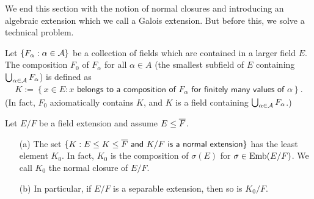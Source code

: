 We end this section with the notion of normal closures and introducing an algebraic extension which we call a Galois extension.
But before this, we solve a technical problem.
\begin{obs}\label{composition of infinitely many fields}
    Let $\{F_\alpha: \alpha\in{\mathcal{A}}\}$ be a collection of fields which are contained in a larger field $E$.
    The composition $F_0$ of $F_\alpha$ for all $\alpha\in A$ (the smallest subfield of $E$ containing $\bigcup_{\alpha\in{\mathcal{A}}} F_\alpha$) is defined as
    \begin{align*}
        K:=\left\{x\in E: \textsf{$x$ belongs to a composition of $F_\alpha$ for finitely many values of $\alpha$}\right\}.
    \end{align*}
    (In fact, $F_0$ axiomatically contains $K$, and $K$ is a field containing $\bigcup_{\alpha\in{\mathcal{A}}} F_\alpha$.)
\end{obs}
\begin{thm}\label{normal closure}
    Let $E/F$ be a field extension and assume $E\leq\overline{F}$.
    \begin{enumerate}
        \item[(a)]
        {
            The set $\{K: \textsf{$E\leq K\leq\overline{F}$ and $K/F$ is a normal extension}\}$ has the least element $K_0$.
            In fact, $K_0$ is the composition of $\sigma(E)$ for $\sigma\in{\textrm{Emb}({E/F})}$.
            We call $K_0$ the normal closure of $E/F$.
        }
        \item[(b)]
        {
            In particular, if $E/F$ is a separable extension, then so is $K_0/F$.
        }
    \end{enumerate}
\end{thm}
